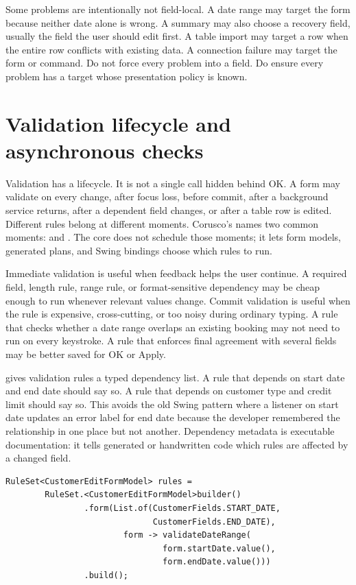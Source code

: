Some problems are intentionally not field-local. A date range may target the
form because neither date alone is wrong. A summary may also choose a recovery
field, usually the field the user should edit first. A table import may target
a row when the entire row conflicts with existing data. A connection failure
may target the form or command. Do not force every problem into a field. Do
ensure every problem has a target whose presentation policy is known.

\section{Validation lifecycle and asynchronous checks}

Validation has a lifecycle. It is not a single call hidden behind OK. A form may
validate on every change, after focus loss, before commit, after a background
service returns, after a dependent field changes, or after a table row is
edited. Different rules belong at different moments. Corusco's
 names two common moments:  and
. The core does not schedule those moments; it lets form models,
generated plans, and Swing bindings choose which rules to run.

Immediate validation is useful when feedback helps the user continue. A
required field, length rule, range rule, or format-sensitive dependency may be
cheap enough to run whenever relevant values change. Commit validation is
useful when the rule is expensive, cross-cutting, or too noisy during ordinary
typing. A rule that checks whether a date range overlaps an existing booking
may not need to run on every keystroke. A rule that enforces final agreement
with several fields may be better saved for OK or Apply.

 gives validation rules a typed dependency list. A rule that
depends on start date and end date should say so. A rule that depends on
customer type and credit limit should say so. This avoids the old Swing pattern
where a listener on start date updates an error label for end date because the
developer remembered the relationship in one place but not another. Dependency
metadata is executable documentation: it tells generated or handwritten code
which rules are affected by a changed field.

\begin{lstlisting}[caption={A cross-field rule with explicit dependencies.}]
RuleSet<CustomerEditFormModel> rules =
        RuleSet.<CustomerEditFormModel>builder()
                .form(List.of(CustomerFields.START_DATE,
                              CustomerFields.END_DATE),
                        form -> validateDateRange(
                                form.startDate.value(),
                                form.endDate.value()))
                .build();
\end{lstlisting}

